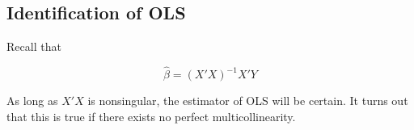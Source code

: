 \subsection{Identification of OLS}

Recall that 

\begin{equation*}
    \hat{\beta} = (X'X)^{-1}X'Y
\end{equation*}

As long as $X'X$ is nonsingular, the estimator of OLS will be certain. It turns out that this is true if there exists no perfect multicollinearity. 